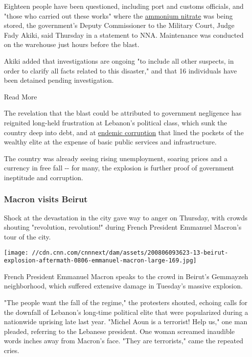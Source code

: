 Eighteen people have been questioned, including port and customs
officials, and "those who carried out these works" where the
\href{https://edition.cnn.com/2020/08/05/middleeast/ammonium-nitrate-beirut-blast-intl/index.html}{ammonium
nitrate} was being stored, the government's Deputy Commissioner to the
Military Court, Judge Fady Akiki, said Thursday in a statement to NNA.
Maintenance was conducted on the warehouse just hours before the blast.

Akiki added that investigations are ongoing "to include all other
suspects, in order to clarify all facts related to this disaster," and
that 16 individuals have been detained pending investigation.

Read More

The revelation that the blast could be attributed to government
negligence has reignited long-held frustration at Lebanon's political
class, which sunk the country deep into debt, and at
\href{https://www.cnn.com/videos/world/2019/11/08/lebanon-corruption-protest-wedeman-pkg.cnn}{endemic
corruption} that lined the pockets of the wealthy elite at the expense
of basic public services and infrastructure.

The country was already seeing rising unemployment, soaring prices and a
currency in free fall -\/- for many, the explosion is further proof of
government ineptitude and corruption.

\hypertarget{macron-visits-beirut}{%
\subsubsection{Macron visits Beirut}\label{macron-visits-beirut}}

Shock at the devastation in the city gave way to anger on Thursday, with
crowds shouting "revolution, revolution!" during French President
Emmanuel Macron's tour of the city.

\texttt{[image: //cdn.cnn.com/cnnnext/dam/assets/200806093623-13-beirut-explosion-aftermath-0806-emmanuel-macron-large-169.jpg]}

French President Emmanuel Macron speaks to the crowd in Beirut's
Gemmayzeh neighborhood, which suffered extensive damage in Tuesday's
massive explosion.

"The people want the fall of the regime," the protesters shouted,
echoing calls for the downfall of Lebanon's long-time political elite
that were popularized during a nationwide uprising late last year.
"Michel Aoun is a terrorist! Help us," one man pleaded, referring to the
Lebanese president. One woman screamed inaudible words inches away from
Macron's face. "They are terrorists," came the repeated cries.

